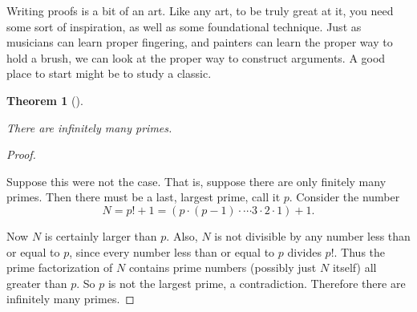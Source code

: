 \documentclass[10pt,]{book}
\theoremstyle{plain}
\newtheorem{theorem}{Theorem}[section]
\theoremstyle{definition}
\theoremstyle{definition}
\theoremstyle{definition}
\numberwithin{equation}{chapter}
\begin{document}
Writing proofs is a bit of an art. Like any art, to be truly great at it, you need some sort of inspiration, as well as some foundational technique. Just as musicians can learn proper fingering, and painters can learn the proper way to hold a brush, we can look at the proper way to construct arguments. A good place to start might be to study a classic.
%
\begin{theorem}[]\label{theorem-1}

There are infinitely many primes.
%
\end{theorem}
\begin{proof}\hypertarget{proof-32}{}

Suppose this were not the case. That is, suppose there are only finitely many primes. Then there must be a last, largest prime, call it \(p\). Consider the number
\begin{equation*}
  N = p! + 1 = (p \cdot (p-1) \cdot \cdots 3\cdot 2 \cdot 1) + 1.
\end{equation*}
%
\par

Now \(N\) is certainly larger than \(p\). Also, \(N\) is not divisible by any number less than or equal to \(p\), since every number less than or equal to \(p\) divides \(p!\). Thus the prime factorization of \(N\) contains prime numbers (possibly just \(N\) itself) all greater than \(p\). So \(p\) is not the largest prime, a contradiction. Therefore there are infinitely many primes.
%
\end{proof}
\par
\end{document}
